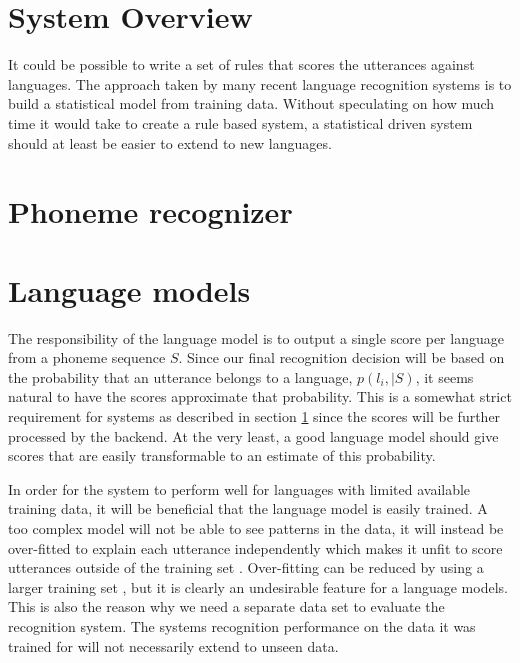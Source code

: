 \section{System Overview}
\label{sect:sysoverview}

It could be possible to write a set of rules that scores the utterances against languages. The approach taken by many recent language recognition systems is to build a statistical model from training data. Without speculating on how much time it would take to create a rule based system, a statistical driven system should at least be easier to extend to new languages.


\section{Phoneme recognizer}
\label{sect:phnrec}




\section{Language models}
\label{sect:basiclangmodel}

The responsibility of the language model is to output a single score per language from a phoneme sequence $S$. Since our final recognition decision will be based on the probability that an utterance belongs to a language, $p(l_i, | S)$, it seems natural to have the scores approximate that probability. This is a somewhat strict requirement for systems as described in section \ref{sect:sysoverview} since the scores will be further processed by the backend. At the very least, a good language model should give scores that are easily transformable to an estimate of this probability. 

In order for the system to perform well for languages with limited available training data, it will be beneficial that the language model is easily trained. A too complex model will not be able to see patterns in the data, it will instead be over-fitted to explain each utterance independently which makes it unfit to score utterances outside of the training set \cite[311]{information}. Over-fitting can be reduced by using a larger training set \cite[147]{machinelearningbook}, but it is clearly an undesirable feature for a language models. This is also the reason why we need a separate data set to evaluate the recognition system. The systems recognition performance on the data it was trained for will not necessarily extend to unseen data.

